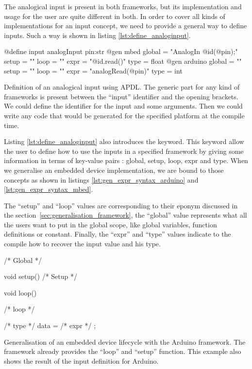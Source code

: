 The analogical input is present in both frameworks, but its implementation and
usage for the user are quite different in both. In order to cover all kinds of
implementations for an input concept, we need to provide a general way to define
inputs. Such a way is shown in listing \ref{lst:define_analoginput}.

\begin{listing}[H]
  \centering
\begin{apdlcode}
@define input analogInput pin:str {
    @gen mbed {
        global = "AnalogIn @id(@pin);"
        setup = ""
        loop = ""
        expr = "@id.read()"
        type = float
    }
    @gen arduino {
        global = ""
        setup = ""
        loop = ""
        expr = "analogRead(@pin)"
        type = int
    }
}
\end{apdlcode}
  \caption[Definition of an analogical input using \gls{APDL}]{Definition of an
analogical input using \gls{APDL}. The generic part for any kind of frameworks is
present between the ``input'' identifier and the opening brackets. We could
define the identifier for the input and some arguments. Then we could write any
code that would be generated for the specified platform at the compile time.}
  \label{lst:define_analoginput}
\end{listing}

Listing \ref{lst:define_analoginput} also introduces the 
keyword. This keyword allow the user to define how to use the inputs in a
specified framework by giving some information in terms of key-value pairs :
global, setup, loop, expr and type. When we generalise an embedded device
implementation, we are bound to those concepts as shown in listings
\ref{lst:gen_expr_syntax_arduino} and \ref{lst:gen_expr_syntax_mbed}.

The ``setup'' and ``loop'' values are corresponding to their eponym discussed in
the section~\ref{sec:generalisation_framework}, the ``global'' value represents what all the
users want to put in the global scope, like global variables, function
definitions or constant. Finally, the ``expr'' and ``type'' values indicate to the compile how
to recover the input value and his type.

\begin{listing}[H]
  \centering
\begin{arduinocode}
/* Global */

void setup(){
  /* Setup */
}

void loop(){
  /* loop */

  /* type */ data = /* expr */ ;
}
\end{arduinocode}
  \caption[Generalisation of an embedded device lifecycle with
Arduino]{Generalisation of an embedded device lifecycle with the Arduino
framework. The framework already provides the ``loop'' and ``setup'' function.
This example also shows the result of the input definition for Arduino.}
  \label{lst:gen_expr_syntax_arduino}
\end{listing}

